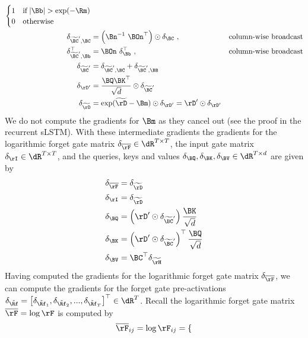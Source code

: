 \documentclass[dvipsnames]{article}
\begin{document}
\begin{appendix}
\begin{alignat}{2}
\begin{cases}
        1 & \text{if} \; |\Bb| > \exp(-\bm{\Rm}) \\
        0 & \text{otherwise}
    \end{cases} \\
    \delta_{\widetilde{\BC}', \BC} &= \left(\Bn^{-1} \ \BOn^\top \right) \odot \delta_{\BC} \ , \quad &\text{column-wise broadcast} \\
    \delta_{\widetilde{\BC}', \Bb}^\top &= \BOn \ \delta_{\Bb}^\top \ , \quad &\text{column-wise broadcast} \\
    \delta_{\widetilde{\BC}'} &= \delta_{\widetilde{\BC}', \BC} + \delta_{\widetilde{\BC}', \BB} \\
    \delta_{\bm{\rD}'} &= \frac{\BQ \BK^\top}{\sqrt{d}} \odot \delta_{\widetilde{\BC}'} \\
    \delta_{\widetilde{\bm{\rD}}} &= \exp(\widetilde{\bm{\rD}} - \Bm) \odot \delta_{\bm{\rD}'} = \bm{\rD}' \odot \delta_{\bm{\rD}'}
\end{alignat}
We do not compute the gradients for $\Bm$ as they cancel out (see the proof in the recurrent sLSTM).
With these intermediate gradients the gradients for the logarithmic forget gate matrix $\delta_{\overline{\bm{\rF}}} \in \dR^{T \times T}$, the input gate matrix $\delta_{\bm{\rI}} \in \dR^{T \times T}$,
and the queries, keys and values $\delta_{\BQ}, \delta_{\BK}, \delta_{\BV} \in \dR^{T \times d}$ are given by
\begin{alignat}{1}
    \delta_{\overline{\bm{\rF}}} &= \delta_{\widetilde{\bm{\rD}}} \\
    \delta_{\bm{\rI}} &= \delta_{\widetilde{\bm{\rD}}} \\
    \delta_{\BQ} &= \left( \bm{\rD}' \odot \delta_{\widetilde{\BC}'} \right) \frac{\BK}{\sqrt{d}} \\
    \delta_{\BK} &= \left( \bm{\rD}' \odot \delta_{\widetilde{\BC}'} \right)^\top \frac{\BQ}{\sqrt{d}} \\
    \delta_{\BV} &= \BC^\top \delta_{\widetilde{\bm{\rH}}}
\end{alignat}
Having computed the gradients for the logarithmic forget gate matrix $\delta_{\overline{\bm{\rF}}}$,
we can compute the gradients for the forget gate pre-activations $\delta_{\tilde{\bm{\Rf}}} = \left[\delta_{\tilde{\Rf}_1}, \delta_{\tilde{\Rf}_2}, ..., \delta_{\tilde{\Rf}_T} \right]^\top \in \dR^T$.
Recall the logarithmic forget gate matrix $\overline{\bm{\rF}} = \log \bm{\rF}$ is computed by
\begin{equation}
    \overline{\bm{\rF}}_{ij} = \log \bm{\rF}_{ij} = \begin{cases}

\end{cases}
\end{equation}
\end{appendix}
\end{document}
